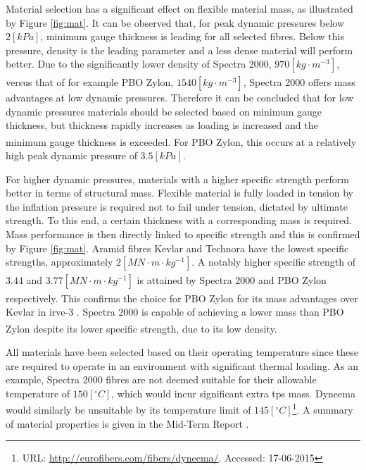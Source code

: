 Material selection has a significant effect on flexible material mass, as illustrated by Figure \ref{fig:mat}. It can be observed that, for peak dynamic pressures below $2 \left[kPa\right]$, minimum gauge thickness is leading for all selected fibres. Below this pressure, density is the leading parameter and a less dense material will perform better. Due to the significantly lower density of Spectra 2000, $970 \left[kg \cdot m^{-3}\right]$, versus that of for example PBO Zylon\textsuperscript{\textregistered}, $1540 \left[kg \cdot m^{-3}\right]$, Spectra 2000 offers mass advantages at low dynamic pressures. Therefore it can be concluded that for low dynamic pressures materials should be selected based on minimum gauge thickness, but thickness rapidly increases as loading is increased and the minimum gauge thickness is exceeded. For PBO Zylon\textsuperscript{\textregistered}, this occurs at a relatively high peak dynamic pressure of $3.5 \left[kPa\right]$.

For higher dynamic pressures, materials with a higher specific strength perform better in terms of structural mass. Flexible material is fully loaded in tension by the inflation pressure is required not to fail under tension, dictated by ultimate strength. To this end, a certain thickness with a corresponding mass is required. Mass performance is then directly linked to specific strength and this is confirmed by Figure \ref{fig:mat}. Aramid fibres Kevlar and Technora have the lowest specific strengths, approximately $2 \left[MN\cdot m \cdot kg^{-1}\right]$. A notably higher specific strength of $3.44$ and $3.77 \left[MN\cdot m \cdot kg^{-1}\right]$ is attained by Spectra 2000 and PBO Zylon\textsuperscript{\textregistered} respectively. This confirms the choice for PBO Zylon\textsuperscript{\textregistered} for its mass advantages over Kevlar in \gls{irve}-3 \cite{Dillman2012a}. Spectra 2000 is capable of achieving a lower mass than PBO Zylon\textsuperscript{\textregistered} despite its lower specific strength, due to its low density. 

All materials have been selected based on their operating temperature since these are required to operate in an environment with significant thermal loading. As an example, Spectra 2000 fibres are not deemed suitable for their allowable temperature of $150 \left[^{\circ}C\right]$, which would incur significant extra \acrfull{tps} mass. Dyneema would similarly be unsuitable by its temperature limit of $145 \left[^{\circ}C\right]$\footnote{URL: \url{http://eurofibers.com/fibers/dyneema/}. Accessed: 17-06-2015}. A summary of material properties is given in the Mid-Term Report \cite[p.64]{Balasooriyan2015b}. 

